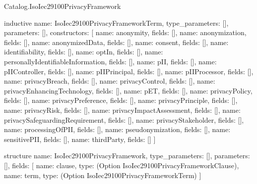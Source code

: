 \begin{lexlean}{Catalog.IsoIec29100PrivacyFramework}
\begin{semanticmodule}
inductive{
  name: IsoIec29100PrivacyFrameworkTerm,
  type_parameters: [],
  parameters: [],
  constructors: [
    {name: anonymity, fields: []},
    {name: anonymization, fields: []},
    {name: anonymizedData, fields: []},
    {name: consent, fields: []},
    {name: identifiability, fields: []},
    {name: optIn, fields: []},
    {name: personallyIdentifiableInformation, fields: []},
    {name: pII, fields: []},
    {name: pIIController, fields: []},
    {name: pIIPrincipal, fields: []},
    {name: pIIProcessor, fields: []},
    {name: privacyBreach, fields: []},
    {name: privacyControl, fields: []},
    {name: privacyEnhancingTechnology, fields: []},
    {name: pET, fields: []},
    {name: privacyPolicy, fields: []},
    {name: privacyPreference, fields: []},
    {name: privacyPrinciple, fields: []},
    {name: privacyRisk, fields: []},
    {name: privacyImpactAssessment, fields: []},
    {name: privacySafeguardingRequirement, fields: []},
    {name: privacyStakeholder, fields: []},
    {name: processingOfPII, fields: []},
    {name: pseudonymization, fields: []},
    {name: sensitivePII, fields: []},
    {name: thirdParty, fields: []}
  ]
}

structure{
  name: IsoIec29100PrivacyFramework,
  type_parameters: [],
  parameters: [],
  fields: [
    {name: clause, type: (Option IsoIec29100PrivacyFrameworkClause)},
    {name: term, type: (Option IsoIec29100PrivacyFrameworkTerm)}
  ]
}
\end{semanticmodule}
\end{lexlean}
